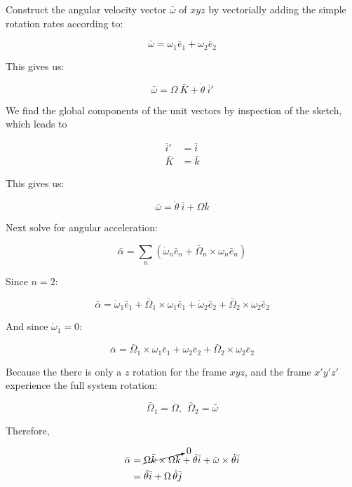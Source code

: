 \documentclass[12pt, letterpaper]{../assignment}
\begin{document}
Construct the angular velocity vector $\bar{\omega}$ of $xyz$ by vectorially adding the simple rotation rates according to:

$$ \bar{\omega} = \omega_1 \bar{e}_1 + \omega_2 \bar{e}_2$$

This gives us:

$$ \bar{\omega} = \Omega\ \bar{K} + \dot{\theta}\ \bar{i}'$$

We find the global components of the unit vectors by inspection of the sketch, which leads to

\begin{equation*}
\begin{aligned}
    \bar{i}' &=\bar{i} \\
    \bar{K} &= \bar{k}
\end{aligned}
\end{equation*}

This gives us:

$$ \bar{\omega} = \dot{\theta}\ \bar{i}  +\Omega \bar{k} $$

Next solve for angular acceleration:

$$ \bar{\alpha} =
\sum_n \left( \dot{\omega}_n \bar{e}_n + \bar{\Omega}_n \times \omega_n \bar{e}_n \right) $$

Since $n=2$:

$$ \bar{\alpha} =
\dot{\omega}_1 \bar{e}_1 + \bar{\Omega}_1 \times \omega_1 \bar{e}_1 +
\dot{\omega}_2 \bar{e}_2 + \bar{\Omega}_2 \times \omega_2 \bar{e}_2 $$

And since $\dot{\omega}_1 = 0$:

$$ \bar{\alpha} =
\bar{\Omega}_1 \times \omega_1 \bar{e}_1 +
\dot{\omega}_2 \bar{e}_2 + \bar{\Omega}_2 \times \omega_2 \bar{e}_2 $$

Because the there is only a $z$ rotation for the frame $xyz$,
and the frame $x'y'z'$ experience the full system rotation:

$$ \bar{\Omega}_1 = \Omega, \ \ \bar{\Omega}_2 = \bar{\omega} $$

Therefore,

\begin{equation*}
\begin{aligned}
\bar{\alpha} &= \cancelto{0}{\Omega \bar{k} \times \Omega \bar{k}} + \dot{\theta} \bar{i}  + \bar{\omega} \times \dot{\theta} \bar{i} \\
             &= \ddot{\theta}\bar{i} + \Omega \,\dot{\theta} \bar{j}
\end{aligned}
\end{equation*}
\end{document}
